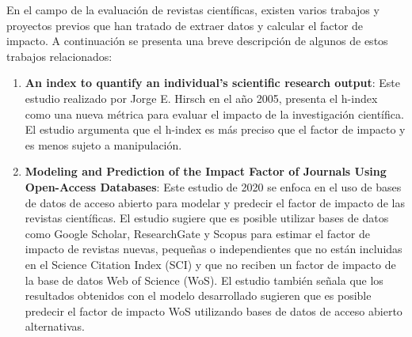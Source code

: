 
En el campo de la evaluación de revistas científicas, existen varios trabajos y proyectos previos que han tratado de extraer datos y calcular el factor de impacto. A continuación se presenta una breve descripción de algunos de estos trabajos relacionados:

\begin{enumerate}

  \item \textbf{An index to quantify an individual's scientific research output}\cite{hirsch2005}:  Este estudio realizado por Jorge E. Hirsch en el año 2005, presenta el h-index como una nueva métrica para evaluar el impacto de la investigación científica. El estudio argumenta que el h-index es más preciso que el factor de impacto y es menos sujeto a manipulación.

  \item \textbf{Modeling and Prediction of the Impact Factor of Journals Using Open-Access Databases}\cite{templ2020}: Este estudio de 2020 se enfoca en el uso de bases de datos de acceso abierto para modelar y predecir el factor de impacto de las revistas científicas. El estudio sugiere que es posible utilizar bases de datos como Google Scholar, ResearchGate y Scopus para estimar el factor de impacto de revistas nuevas, pequeñas o independientes que no están incluidas en el Science Citation Index (SCI) y que no reciben un factor de impacto de la base de datos Web of Science (WoS). El estudio también señala que los resultados obtenidos con el modelo desarrollado sugieren que es posible predecir el factor de impacto WoS utilizando bases de datos de acceso abierto alternativas.
\end{enumerate}

